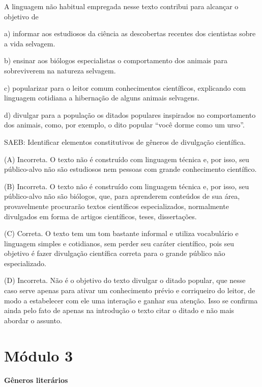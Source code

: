
A linguagem não habitual empregada nesse texto contribui para alcançar o
objetivo de

a) informar aos estudiosos da ciência as descobertas recentes dos
cientistas sobre a vida selvagem.

b) ensinar aos biólogos especialistas o comportamento dos animais para
sobreviverem na natureza selvagem.

c) popularizar para o leitor comum conhecimentos científicos, explicando
com linguagem cotidiana a hibernação de alguns animais selvagens.

d) divulgar para a população os ditados populares inspirados no
comportamento dos animais, como, por exemplo, o dito popular ``você
dorme como um urso''.

SAEB: Identificar elementos constitutivos de gêneros de divulgação
científica.

(A) Incorreta. O texto não é construído com linguagem técnica e, por
isso, seu público-alvo não são estudiosos nem pessoas com grande
conhecimento científico.

(B) Incorreta. O texto não é construído com linguagem técnica e, por
isso, seu público-alvo não são biólogos, que, para aprenderem conteúdos
de sua área, provavelmente procurarão textos científicos especializados,
normalmente divulgados em forma de artigos científicos, teses,
dissertações.

(C) Correta. O texto tem um tom bastante informal e utiliza vocabulário
e linguagem simples e cotidianos, sem perder seu caráter científico,
pois seu objetivo é fazer divulgação científica correta para o grande
público não especializado.

(D) Incorreta. Não é o objetivo do texto divulgar o ditado popular, que
nesse caso serve apenas para ativar um conhecimento prévio e corriqueiro
do leitor, de modo a estabelecer com ele uma interação e ganhar sua
atenção. Isso se confirma ainda pelo fato de apenas na introdução o
texto citar o ditado e não mais abordar o assunto.

\hypertarget{muxf3dulo-3}{%
\section{Módulo 3}\label{muxf3dulo-3}}

\textbf{Gêneros literários}

